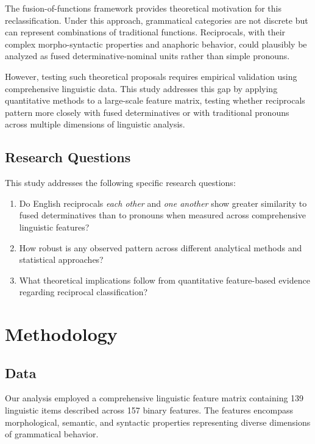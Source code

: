 \documentclass[12pt]{article}
\begin{document}
The fusion-of-functions framework \citep{payne2007fusion} provides theoretical motivation for this reclassification. Under this approach, grammatical categories are not discrete but can represent combinations of traditional functions. Reciprocals, with their complex morpho-syntactic properties and anaphoric behavior, could plausibly be analyzed as fused determinative-nominal units rather than simple pronouns.

However, testing such theoretical proposals requires empirical validation using comprehensive linguistic data. This study addresses this gap by applying quantitative methods to a large-scale feature matrix, testing whether reciprocals pattern more closely with fused determinatives or with traditional pronouns across multiple dimensions of linguistic analysis.

\subsection{Research Questions}

This study addresses the following specific research questions:

\begin{enumerate}
\item Do English reciprocals \textit{each other} and \textit{one another} show greater similarity to fused determinatives than to pronouns when measured across comprehensive linguistic features?
\item How robust is any observed pattern across different analytical methods and statistical approaches?
\item What theoretical implications follow from quantitative feature-based evidence regarding reciprocal classification?
\end{enumerate}

\section{Methodology}

\subsection{Data}

Our analysis employed a comprehensive linguistic feature matrix containing 139 linguistic items described across 157 binary features. The features encompass morphological, semantic, and syntactic properties representing diverse dimensions of grammatical behavior.
\end{document}
